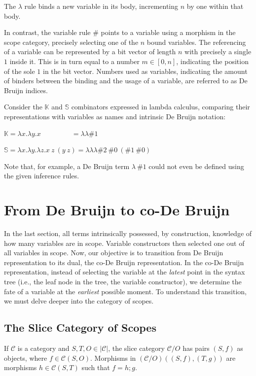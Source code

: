 \documentclass[runningheads]{llncs}
\begin{document}
The $λ$ rule binds a new variable in its body, incrementing $n$ by one within that body. 

In contrast, the variable rule $\#$ points to a variable using a morphism in the scope category, precisely selecting one of the $n$ bound variables. 
The referencing of a variable can be represented by a bit vector of length $n$ with precisely a single $1$ inside it. 
This is in turn equal to a number $m ∈ [0, n]$, indicating the position of the sole $1$ in the bit vector.
Numbers used as variables, indicating the amount of binders between the binding and the usage of a variable, are referred to as De Bruijn indices.

\begin{example}
  Consider the $𝕂$ and $𝕊$ combinators expressed in lambda calculus, comparing their representations with variables as names and intrinsic De Bruijn notation:

  \quad $𝕂 = λx. λy. x \quad \quad \quad \quad \ \ = λ  λ \#1$

  \quad $𝕊 = λx. λy. λz. x \ z \ (y \ z) = λ λ λ \#2 \ \#0 \ (\#1 \ \#0)$

  \noindent Note that, for example, a De Bruijn term $λ \ \#1$ could not even be defined using the given inference rules.
\end{example}

\section{From De Bruijn to co-De Bruijn}
In the last section, all terms intrinsically possessed, by construction, knowledge of how many variables are in scope. 
Variable constructors then selected one out of all variables in scope. 
Now, our objective is to transition from De Bruijn representation to its dual, the co-De Bruijn representation.
In the co-De Bruijn representation, instead of selecting the variable at the \emph{latest} point in the syntax tree (i.e., the leaf node in the tree, the variable constructor), we determine the fate of a variable at the \emph{earliest} possible moment.
To understand this transition, we must delve deeper into the category of scopes.

\subsection{The Slice Category of Scopes}
\begin{definition}
  If $𝒞$ is a category and $S, T, O ∈ |𝒞|$, the slice category $𝒞/O$ has pairs $(S, f)$ as objects, where $f ∈ 𝒞(S, O)$. Morphisms in $(𝒞/O)((S, f), (T, g))$ are morphisms $h ∈ 𝒞(S, T)$ such that $f = h;g$.
\end{definition}
\end{document}
